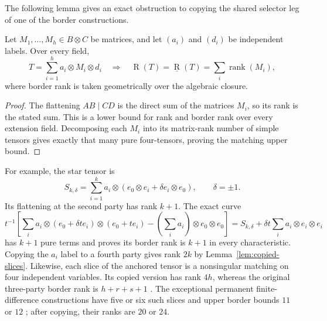 The following lemma gives an exact obstruction to copying the shared selector leg of one of the border constructions.
\begin{lemma}\label{lem:copied-slices}
Let $M_1,\ldots,M_h\in B\otimes C$ be matrices, and let $(a_i)$ and $(d_i)$ be independent labels. Over every field,
\[
 T=\sum_{i=1}^h a_i\otimes M_i\otimes d_i
 \quad\Longrightarrow\quad
 \operatorname R(T)=\underline{\operatorname R}(T)
 =\sum_i\operatorname{rank}(M_i),
\]
where border rank is taken geometrically over the algebraic closure.
\end{lemma}
\begin{proof}
The flattening $AB\mid CD$ is the direct sum of the matrices $M_i$, so its rank is the stated sum. This is a lower bound for rank and border rank over every extension field. Decomposing each $M_i$ into its matrix-rank number of simple tensors gives exactly that many pure four-tensors, proving the matching upper bound.
\end{proof}

For example, the star tensor is
\[
 S_{k,\delta}=\sum_{i=1}^k a_i\otimes
 (e_0\otimes e_i+\delta e_i\otimes e_0),\qquad\delta=\pm1.
\]
Its flattening at the second party has rank $k+1$. The exact curve
\[
 t^{-1}\left[\sum_i a_i\otimes(e_0+\delta t e_i)
                  \otimes(e_0+t e_i)
 -(\sum_i a_i)\otimes e_0\otimes e_0\right]
 =S_{k,\delta}+\delta t\sum_i a_i\otimes e_i\otimes e_i
\]
has $k+1$ pure terms and proves its border rank is $k+1$ in every characteristic. Copying the $a_i$ label to a fourth party gives rank $2k$ by Lemma~\ref{lem:copied-slices}. Likewise, each slice of the anchored tensor is a nonsingular matching on four independent variables. Its copied version has rank $4h$, whereas the original three-party border rank is $h+r+s+1$ \cite[``anchored collections have explicit exact border rank'']{SuppliedPencils2026}. The exceptional permanent finite-difference constructions have five or six such slices and upper border bounds $11$ or $12$ \cite[``finite differences for the exceptional permanent subspaces'']{SuppliedPencils2026}; after copying, their ranks are $20$ or $24$.

